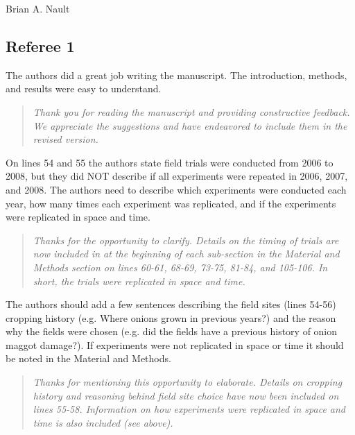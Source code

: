\documentclass{article}
\begin{document}
Brian A. Nault
\vspace{0.48em} 


\vspace{1.4em}

\hline

\setlength\parindent{0pt}

\subsection*{Referee 1}

The authors did a great job writing the manuscript.  The introduction, methods, and results were easy to understand.    

\begin{quote}
    \textit{Thank you for reading the manuscript and providing constructive feedback.  We appreciate the suggestions and have endeavored to include them in the revised version.  }
\end{quote}

On lines 54 and 55 the authors state field trials were conducted from 2006 to 2008, but they did NOT describe if all experiments were repeated in 2006, 2007, and 2008.  The authors need to describe which experiments were conducted each year, how many times each experiment was replicated, and if the experiments were replicated in space and time.  

\begin{quote}
    \textit{Thanks for the opportunity to clarify.  Details on the timing of trials are now included in at the beginning of each sub-section in the Material and Methods section on lines 60-61, 68-69, 73-75, 81-84, and 105-106.  In short, the trials were replicated in space and time.  }
\end{quote}


The authors should add a few sentences describing the field sites (lines 54-56) cropping history (e.g. Where onions grown in previous years?) and the reason why the fields were chosen (e.g. did the fields have a previous history of onion maggot damage?).  If experiments were not replicated in space or time it should be noted in the Material and Methods. 

\begin{quote}
    \textit{Thanks for mentioning this opportunity to elaborate.  Details on cropping history and reasoning behind field site choice have now been included on lines 55-58.  Information on how experiments were replicated in space and time is also included (see above).  }
\end{quote}
\end{document}
